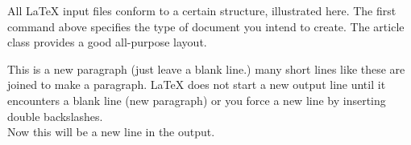 \documentclass{article}
\begin{document}
All LaTeX input files conform to a certain structure, illustrated here.
The first command above specifies the type of document you intend to create. 
The article class provides a good all-purpose layout.

This is a new paragraph (just leave a blank line.) 
many short lines
like these
are joined to make a paragraph. LaTeX does not start a new output
line until it encounters a blank line (new paragraph) or you force
a new line by inserting double backslashes.\\ Now this will be
a new line in the output.

\end{document}
